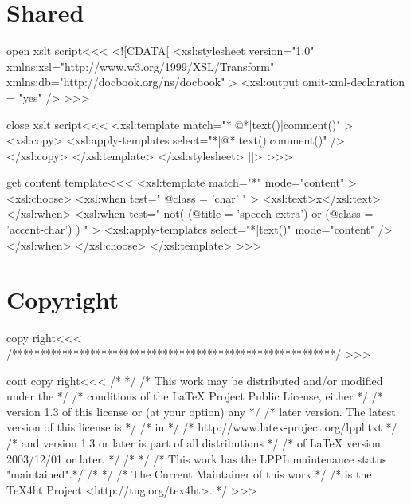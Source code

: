 \documentclass{article}
\begin{document}
\section{Shared}



\<open xslt script\><<<
<![CDATA[ 
   <xsl:stylesheet version="1.0"
      xmlns:xsl="http://www.w3.org/1999/XSL/Transform"
      xmlns:db="http://docbook.org/ns/docbook"
   >
      <xsl:output omit-xml-declaration = "yes" />
>>>

\<close xslt script\><<<
      <xsl:template match="*|@*|text()|comment()" >
        <xsl:copy>
          <xsl:apply-templates select="*|@*|text()|comment()" />
        </xsl:copy>
      </xsl:template>
   </xsl:stylesheet> 
]]>
>>>


\<get content template\><<<
<xsl:template match="*" mode="content" >
  <xsl:choose>
     <xsl:when test=" @class = 'char' " >   
       <xsl:text>x</xsl:text>
     </xsl:when>
     <xsl:when test=" not( 
            (@title = 'speech-extra') or (@class = 'accent-char')
         ) " >
       <xsl:apply-templates select="*|text()" mode="content" />
     </xsl:when>
  </xsl:choose>
</xsl:template> 
>>>





\section{Copyright}

\let\newfilename=\relax

\<copy right\><<< 
/**********************************************************/ >>>



\<cont copy right\><<< 
/*                                                        */
/* This work may be distributed and/or modified under the */
/* conditions of the LaTeX Project Public License, either */
/* version 1.3 of this license or (at your option) any    */
/* later version. The latest version of this license is   */
/* in                                                     */
/*   http://www.latex-project.org/lppl.txt                */
/* and version 1.3 or later is part of all distributions  */
/* of LaTeX version 2003/12/01 or later.                  */
/*                                                        */
/* This work has the LPPL maintenance status "maintained".*/
/*                                                        */
/* The Current Maintainer of this work                    */
/* is the TeX4ht Project <http://tug.org/tex4ht>.         */
>>>



\end{document}

